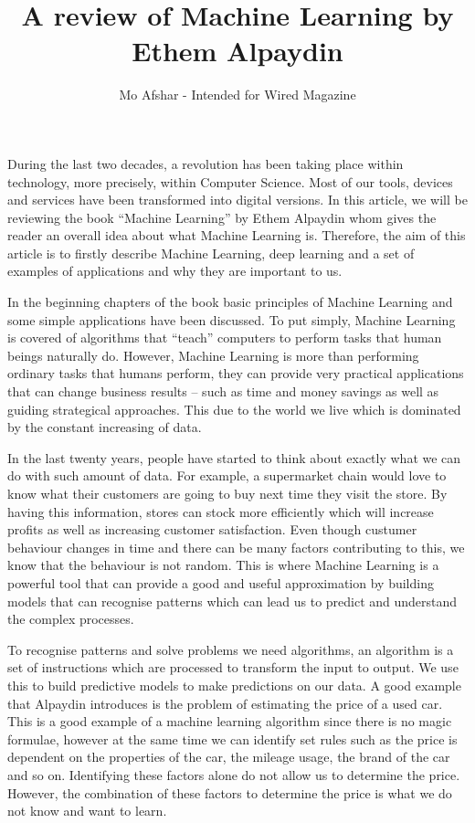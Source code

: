 \documentclass[11pt]{article} %
\title{A review of Machine Learning by Ethem Alpaydin }
\author{Mo Afshar - Intended for Wired Magazine}
\begin{document}
\maketitle
During the last two decades, a revolution has been taking place within technology, more precisely, within Computer Science. Most of our tools, devices and services have been transformed into digital versions. In this article, we will be reviewing the book “Machine Learning” by Ethem Alpaydin whom gives the reader an overall idea about what Machine Learning is. Therefore, the aim of this article is to firstly describe Machine Learning, deep learning and a set of examples of applications and why they are important to us. 
\par

In the beginning chapters of the book basic principles of Machine Learning and some simple applications have been discussed. To put simply, Machine Learning is covered of algorithms that “teach” computers to perform tasks that human beings naturally do. However, Machine Learning is more than performing ordinary tasks that humans perform, they can provide very practical applications that can change business results – such as time and money savings as well as guiding strategical approaches. This due to the world we live which is dominated by the constant increasing of data. 
\par

In the last twenty years, people have started to think about exactly what we can do with such amount of data. For example, a supermarket chain would love to know what their customers are going to buy next time they visit the store. By having this information, stores can stock more efficiently which will increase profits as well as increasing customer satisfaction. Even though custumer behaviour changes in time and there can be many factors contributing to this, we know that the behaviour is not random. This is where Machine Learning is a powerful tool that can provide a good and useful approximation by building models that can recognise patterns which can lead us to predict and understand the complex processes. 
\par

To recognise patterns and solve problems we need algorithms, an algorithm is a set of instructions which are processed to transform the input to output. We use this to build predictive models to make predictions on our data. A good example that Alpaydin introduces is the problem of estimating the price of a used car. This is a good example of a machine learning algorithm since there is no magic formulae, however at the same time we can identify set rules such as the price is dependent on the properties of the car, the mileage usage, the brand of the car and so on. Identifying these factors alone do not allow us to determine the price. However, the combination of these factors to determine the price is what we do not know and want to learn.
\par
\end{document}
